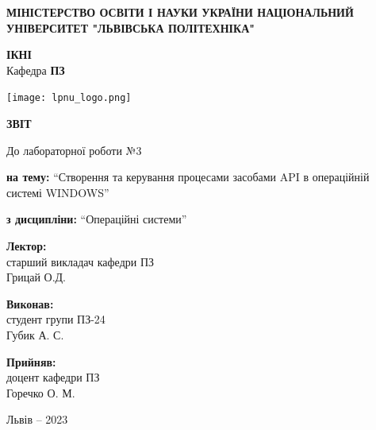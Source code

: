 \documentclass[12pt]{extarticle}
\begin{document}
\begin{titlepage}
    \begin{center}
        \textbf{\normalsize{\MakeUppercase{
            Міністерство Освіти і науки України
            Національний університет "Львівська політехніка"
        }}}

        \begin{flushright}
        \textbf{ІКНІ}\\
        Кафедра \textbf{ПЗ}
        \end{flushright}
        \vspace{15mm}

        \texttt{[image: lpnu\_logo.png]}

        \vspace*{\fill}

        \textbf{\normalsize{\MakeUppercase{Звіт}}}
            
        До лабораторної роботи №3

        \textbf{на тему:} “Створення та керування процесами засобами API в операційній
        системі WINDOWS”

        \textbf{з дисципліни:} “Операційні системи”
            
        \vspace*{\fill}

        \begin{flushright}

            \textbf{Лектор:}\\
            старший викладач кафедри ПЗ\\
            Грицай О.Д.\\
            \vspace{12pt}

            \textbf{Виконав:}\\
            студент групи ПЗ-24\\
            Губик А. С.\\
            \vspace{12pt}

            \textbf{Прийняв:}\\
            доцент кафедри ПЗ\\
            Горечко О. М.\\
        \vspace{12pt}
        \end{flushright}

        Львів -- 2023
            
            
    \end{center}
\end{titlepage}
\end{document}
